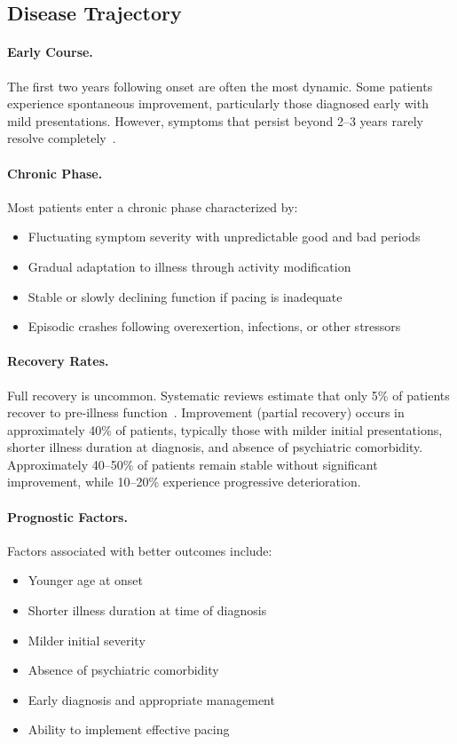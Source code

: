 \subsection{Disease Trajectory}
\label{subsec:trajectory}

\paragraph{Early Course.}
The first two years following onset are often the most dynamic. Some patients experience spontaneous improvement, particularly those diagnosed early with mild presentations. However, symptoms that persist beyond 2--3 years rarely resolve completely~\cite{Cairns2005prognosis}.

\paragraph{Chronic Phase.}
Most patients enter a chronic phase characterized by:
\begin{itemize}
    \item Fluctuating symptom severity with unpredictable good and bad periods
    \item Gradual adaptation to illness through activity modification
    \item Stable or slowly declining function if pacing is inadequate
    \item Episodic crashes following overexertion, infections, or other stressors
\end{itemize}

\paragraph{Recovery Rates.}
Full recovery is uncommon. Systematic reviews estimate that only 5\% of patients recover to pre-illness function~\cite{Cairns2005prognosis}. Improvement (partial recovery) occurs in approximately 40\% of patients, typically those with milder initial presentations, shorter illness duration at diagnosis, and absence of psychiatric comorbidity. Approximately 40--50\% of patients remain stable without significant improvement, while 10--20\% experience progressive deterioration.

\paragraph{Prognostic Factors.}
Factors associated with better outcomes include:
\begin{itemize}
    \item Younger age at onset
    \item Shorter illness duration at time of diagnosis
    \item Milder initial severity
    \item Absence of psychiatric comorbidity
    \item Early diagnosis and appropriate management
    \item Ability to implement effective pacing
\end{itemize}

